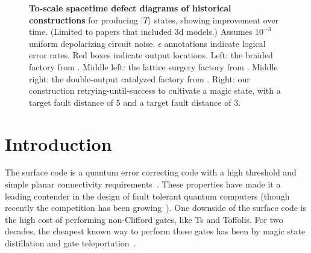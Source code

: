 \documentclass[onecolumn,unpublished,a4paper]{quantumarticle}
\theoremstyle{definition}
\begin{document}
\begin{figure}
    \centering
    \caption{
        \textbf{To-scale spacetime defect diagrams of historical constructions} for producing $|T\rangle$ states, showing improvement over time.
        (Limited to papers that included 3d models.)
        Assumes $10^{-3}$ uniform depolarizing circuit noise.
        $\epsilon$ annotations indicate logical error rates.
        Red boxes indicate output locations.
        Left: the braided factory from \cite{fowler2012bridge}.
        Middle left: the lattice surgery factory from \cite{fowler2018latticesurgery}.
        Middle right: the double-output catalyzed factory from \cite{gidney2019catalyzeddistillation}.
        Right: our construction retrying-until-success to cultivate a magic state, with a target fault distance of 5 and a target fault distance of 3.
    }
    \label{fig:historical-comparison-3d}
\end{figure}

\section{Introduction}
\label{sec:introduction}

The surface code is a quantum error correcting code with a high threshold and simple planar connectivity requirements~\cite{fowler2012surfacecodereview}.
These properties have made it a leading contender in the design of fault tolerant quantum computers (though recently the competition has been growing~\cite{hastings2021dynamically,bravyi2024ldpcibm,gidney2023colorcode}).
One downside of the surface code is the high cost of performing non-Clifford gates, like Ts and Toffolis.
For two decades, the cheapest known way to perform these gates has been by magic state distillation and gate teleportation~\cite{bravyi2005distillation,gidney2019catalyzeddistillation,litinski2019notascostly,hirano2024zeroleveldistill}.
\end{document}
